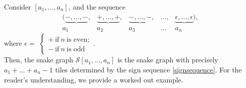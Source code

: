Consider $[a_1,\dots,a_n]$, and the sequence 
\begin{equation}\label{signsequence}
\begin{array}{cccccccc}
  ( \underbrace{ -,\ldots,-},&  \underbrace{ + ,\dots, +},&  \underbrace{ -,\ldots,-},& \ldots,&  \underbrace{\epsilon,\ldots,\epsilon}) ,  \\
 a_1 & a_2 & a_3&\ldots&a_n
\end{array} 
\end{equation}
where $\epsilon = $
$
\begin{cases}
+  \ \text{if} \ n \ \text{is even}; \\
- \ \text{if} \ n \ \text{is odd}
\end{cases}.
$
\\

Then, the snake graph $\mathcal{S}[a_1,\dots,a_n]$ is the snake graph with precisely $a_1 + \dots + a_n - 1$ tiles determined by the sign sequence \ref{signsequence}. For the reader's understanding, we provide a worked out example. 

